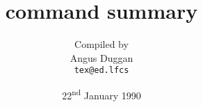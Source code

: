 % 
% 
% 
% 
 

\author{Compiled by\\[6pt]
Angus Duggan
\\[6pt]
{\tt tex@ed.lfcs}}

\title{\PiCTeX{} command summary}

\date{22\textsuperscript{\rm nd} January 1990}

\setleftmargin{1in}{0in}
\setrightmargin{1in}{0in}
\setmarginnote{0in}{0in}

\setcounter{topnumber}{3}
\renewcommand{\topfraction}{.5}
\setcounter{bottomnumber}{3}
\renewcommand{\bottomfraction}{.5}
\setcounter{totalnumber}{5}
\renewcommand{\textfraction}{.25}

\overfullrule=0pt
\hfuzz=3pt

\newcommand{\syspers}{Carol Anstruther}
\newcommand{\texpers}{Angus Duggan}

